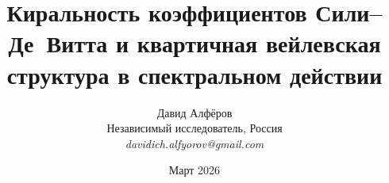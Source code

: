 \documentclass[12pt,a4paper]{article}
\theoremstyle{definition}
\theoremstyle{remark}
\begin{document}
\title{Киральность коэффициентов Сили--Де~Витта и квартичная вейлевская
структура в спектральном действии}

\author{Давид Алфёров\\[4pt]
\small Независимый исследователь, Россия\\[2pt]
\small\textit{davidich.alfyorov@gmail.com}}

\date{Март 2026}

\maketitle

\begin{abstract}


\end{abstract}
\end{document}
